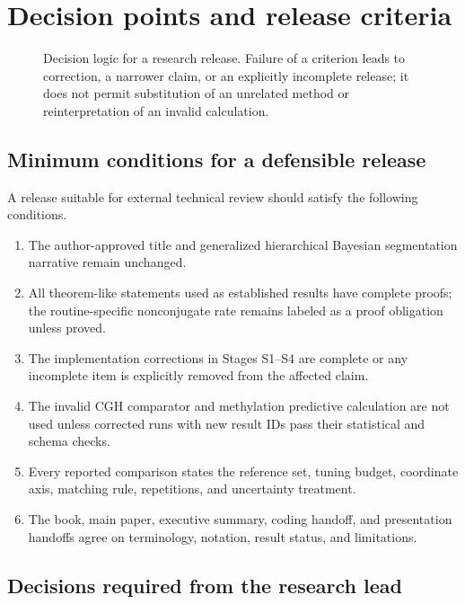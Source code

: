 \section{Decision points and release criteria}
\label{sec:exec-decisions}

\begin{figure}[H]
  \centering
  \resizebox{0.95\textwidth}{!}{}
  \caption{Decision logic for a research release. Failure of a criterion leads to correction, a narrower claim, or an explicitly incomplete release; it does not permit substitution of an unrelated method or reinterpretation of an invalid calculation.}
  \label{fig:exec-release-decisions}
\end{figure}

\subsection{Minimum conditions for a defensible release}

A release suitable for external technical review should satisfy the following conditions.
\begin{enumerate}
  \item The author-approved title and generalized hierarchical Bayesian segmentation narrative remain unchanged.
  \item All theorem-like statements used as established results have complete proofs; the routine-specific nonconjugate rate remains labeled as a proof obligation unless proved.
  \item The implementation corrections in Stages S1--S4 are complete or any incomplete item is explicitly removed from the affected claim.
  \item The invalid CGH comparator and methylation predictive calculation are not used unless corrected runs with new result IDs pass their statistical and schema checks.
  \item Every reported comparison states the reference set, tuning budget, coordinate axis, matching rule, repetitions, and uncertainty treatment.
  \item The book, main paper, executive summary, coding handoff, and presentation handoffs agree on terminology, notation, result status, and limitations.
\end{enumerate}

\subsection{Decisions required from the research lead}


